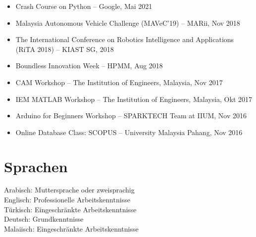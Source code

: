 \documentclass[11pt,a4paper]{article}
\begin{document}
\begin{itemize}
    \item Crash Course on Python -- Google, Mai 2021
    \item Malaysia Autonomous Vehicle Challenge (MAVeC'19) -- MARii, Nov 2018
    \item The International Conference on Robotics Intelligence and Applications (RiTA 2018) -- KIAST SG, 2018
    \item Boundless Innovation Week -- HPMM, Aug 2018
    \item CAM Workshop -- The Institution of Engineers, Malaysia, Nov 2017
    \item IEM MATLAB Workshop -- The Institution of Engineers, Malaysia, Okt 2017
    \item Arduino for Beginners Workshop -- SPARKTECH Team at IIUM, Nov 2016
    \item Online Database Class: SCOPUS -- University Malaysia Pahang, Nov 2016
\end{itemize}

\section*{Sprachen}

Arabisch: Muttersprache oder zweisprachig\\
Englisch: Professionelle Arbeitskenntnisse\\
Türkisch: Eingeschränkte Arbeitskenntnisse\\
Deutsch: Grundkenntnisse\\
Malaiisch: Eingeschränkte Arbeitskenntnisse
\end{document}
